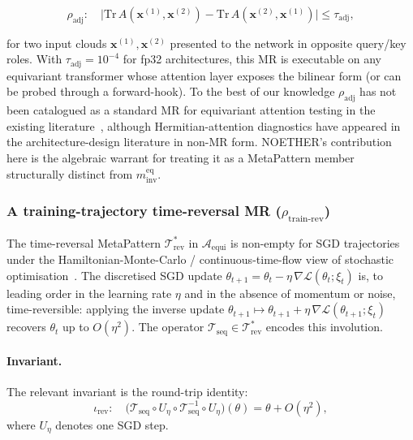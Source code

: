\documentclass[acmsmall,screen,review]{acmart}
\begin{document}
\begin{equation}
\rho_{\mathrm{adj}}: \quad \big| \mathrm{Tr}\,A(\mathbf{x}^{(1)}, \mathbf{x}^{(2)}) - \mathrm{Tr}\,A(\mathbf{x}^{(2)}, \mathbf{x}^{(1)}) \big| \le \tau_{\mathrm{adj}},
\end{equation}

\noindent for two input clouds $\mathbf{x}^{(1)}, \mathbf{x}^{(2)}$ presented to the network in opposite query/key roles. With $\tau_{\mathrm{adj}} = 10^{-4}$ for fp32 architectures, this MR is executable on any equivariant transformer whose attention layer exposes the bilinear form (or can be probed through a forward-hook). To the best of our knowledge $\rho_{\mathrm{adj}}$ has not been catalogued as a standard MR for equivariant attention testing in the existing literature~\cite{Segura2016, MRScout2024, GenMorph2024}, although Hermitian-attention diagnostics have appeared in the architecture-design literature in non-MR form. NOETHER's contribution here is the algebraic warrant for treating it as a MetaPattern member structurally distinct from $m^{\mathrm{eq}}_{\mathrm{inv}}$.

\subsubsection{A training-trajectory time-reversal MR (\texorpdfstring{$\rho_{\mathrm{train\text{-}rev}}$}{rho\_train-rev})}
\label{subsec:rho-rev}

The time-reversal MetaPattern $\mathcal{T}^{*}_{\mathrm{rev}}$ in $\mathcal{A}_{\mathrm{equi}}$ is non-empty for SGD trajectories under the Hamiltonian-Monte-Carlo / continuous-time-flow view of stochastic optimisation~\cite{Chen2014SGHMC}. The discretised SGD update $\theta_{t+1} = \theta_t - \eta\,\nabla\mathcal{L}(\theta_t; \xi_t)$ is, to leading order in the learning rate $\eta$ and in the absence of momentum or noise, time-reversible: applying the inverse update $\theta_{t+1} \mapsto \theta_{t+1} + \eta\,\nabla\mathcal{L}(\theta_{t+1}; \xi_t)$ recovers $\theta_t$ up to $O(\eta^2)$. The operator $\mathcal{T}_{\mathrm{seq}} \in \mathcal{T}^{*}_{\mathrm{rev}}$ encodes this involution.

\paragraph{Invariant.} The relevant invariant is the round-trip identity:
$$\iota_{\mathrm{rev}}: \quad \big(\mathcal{T}_{\mathrm{seq}} \circ U_{\eta} \circ \mathcal{T}_{\mathrm{seq}}^{-1} \circ U_{\eta}\big)(\theta) = \theta + O(\eta^2),$$
where $U_{\eta}$ denotes one SGD step.
\end{document}
